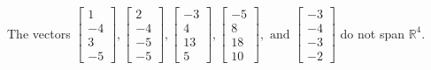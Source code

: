 \begin{exercise}
\begin{exerciseStatement}
  \end{exerciseStatement}
  \begin{exerciseAnswer}
   The vectors \(\left[\begin{array}{r}
1 \\
-4 \\
3 \\
-5
\end{array}\right] , \left[\begin{array}{r}
2 \\
-4 \\
-5 \\
-5
\end{array}\right] , \left[\begin{array}{r}
-3 \\
4 \\
13 \\
5
\end{array}\right] , \left[\begin{array}{r}
-5 \\
8 \\
18 \\
10
\end{array}\right] , \text{ and } \left[\begin{array}{r}
-3 \\
-4 \\
-3 \\
-2
\end{array}\right]\) 
  	 do not  
	span \(\mathbb{R}^4\).
  


  \end{exerciseAnswer}
\end{exercise}